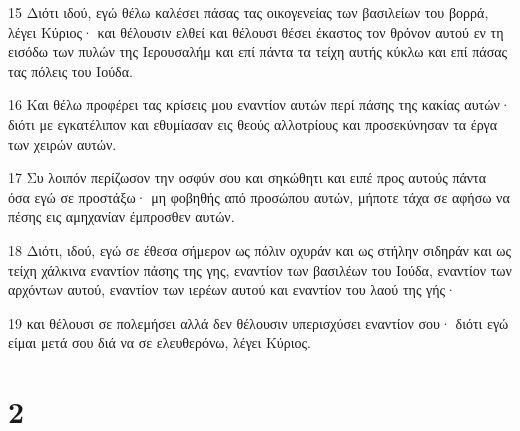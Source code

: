 \par 15 Διότι ιδού, εγώ θέλω καλέσει πάσας τας οικογενείας των βασιλείων του βορρά, λέγει Κύριος· και θέλουσιν ελθεί και θέλουσι θέσει έκαστος τον θρόνον αυτού εν τη εισόδω των πυλών της Ιερουσαλήμ και επί πάντα τα τείχη αυτής κύκλω και επί πάσας τας πόλεις του Ιούδα.
\par 16 Και θέλω προφέρει τας κρίσεις μου εναντίον αυτών περί πάσης της κακίας αυτών· διότι με εγκατέλιπον και εθυμίασαν εις θεούς αλλοτρίους και προσεκύνησαν τα έργα των χειρών αυτών.
\par 17 Συ λοιπόν περίζωσον την οσφύν σου και σηκώθητι και ειπέ προς αυτούς πάντα όσα εγώ σε προστάξω· μη φοβηθής από προσώπου αυτών, μήποτε τάχα σε αφήσω να πέσης εις αμηχανίαν έμπροσθεν αυτών.
\par 18 Διότι, ιδού, εγώ σε έθεσα σήμερον ως πόλιν οχυράν και ως στήλην σιδηράν και ως τείχη χάλκινα εναντίον πάσης της γης, εναντίον των βασιλέων του Ιούδα, εναντίον των αρχόντων αυτού, εναντίον των ιερέων αυτού και εναντίον του λαού της γής·
\par 19 και θέλουσι σε πολεμήσει αλλά δεν θέλουσιν υπερισχύσει εναντίον σου· διότι εγώ είμαι μετά σου διά να σε ελευθερόνω, λέγει Κύριος.

\chapter{2}

